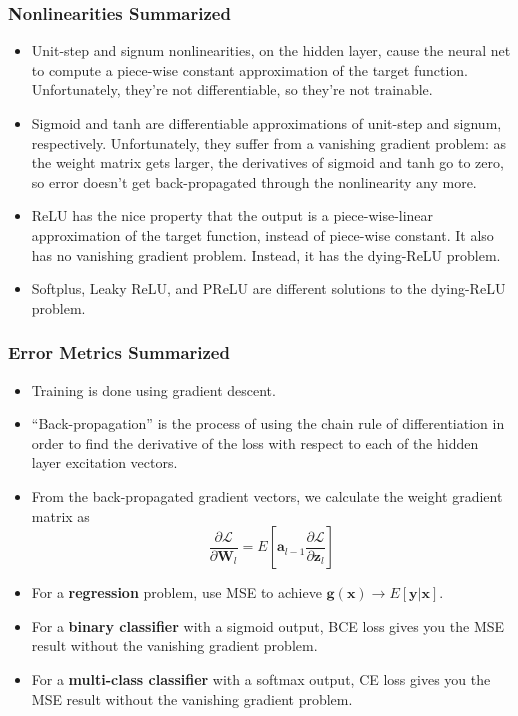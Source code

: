 \documentclass{beamer}
\begin{document}
\begin{frame}
  \frametitle{Nonlinearities Summarized}
  \begin{itemize}
  \item Unit-step and signum nonlinearities, on the hidden layer,
    cause the neural net to compute a piece-wise constant approximation
    of the target function. Unfortunately, they're not differentiable, so they're not
    trainable.
  \item Sigmoid and tanh are differentiable approximations of
    unit-step and signum, respectively.  Unfortunately, they suffer
    from a vanishing gradient problem: as the weight matrix gets
    larger, the derivatives of sigmoid and tanh go to zero, so error
    doesn't get back-propagated through the nonlinearity any more.
  \item ReLU has the nice property that the output is a
    piece-wise-linear approximation of the target function, instead of
    piece-wise constant.  It also has no vanishing gradient problem.
    Instead, it has the dying-ReLU problem.
  \item Softplus, Leaky ReLU, and PReLU are different solutions to the
    dying-ReLU problem.
  \end{itemize}
\end{frame}

\begin{frame}
  \frametitle{Error Metrics Summarized}
  \begin{itemize}
  \item Training is done using gradient descent.
  \item ``Back-propagation'' is the process of using the chain rule of
    differentiation in order to find the derivative of the loss with
    respect to each of the hidden layer excitation vectors.
  \item From the back-propagated gradient vectors, we calculate the
    weight gradient matrix as
    \begin{displaymath}
      \frac{\partial\mathcal{L}}{\partial\mathbf{W}_l}
      =E\left[\mathbf{a}_{l-1}\frac{\partial\mathcal{L}}{\partial\mathbf{z}_l}\right]
    \end{displaymath}
  \item For a {\bf regression} problem, use MSE to achieve
    $\mathbf{g}(\mathbf{x})\rightarrow E\left[\mathbf{y}|\mathbf{x}\right]$. 
  \item For a {\bf binary classifier} with a sigmoid output, BCE loss
    gives you the MSE result without the vanishing gradient problem.
  \item For a {\bf multi-class classifier} with a softmax output, CE
    loss gives you the MSE result without the vanishing gradient
    problem.
  \end{itemize}
\end{frame}
\end{document}
